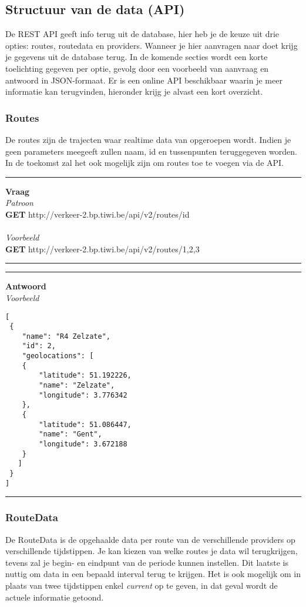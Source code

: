 \documentclass[ps,a4paper,oneside]{report}
\begin{document}
\subsection{Structuur van de data (API)}
De REST API geeft info terug uit de database, hier heb je de keuze uit drie opties: routes, routedata en providers. Wanneer je hier aanvragen naar doet krijg je gegevens uit de database terug. In de komende secties wordt een korte toelichting gegeven per optie, gevolg door een voorbeeld van aanvraag en antwoord in JSON-formaat. Er is een online API beschikbaar waarin je meer informatie kan terugvinden, hieronder krijg je alvast een kort overzicht.

\subsubsection{Routes}
De routes zijn de trajecten waar realtime data van opgeroepen wordt. Indien je geen parameters meegeeft zullen naam, id en tussenpunten teruggegeven worden. In de toekomst zal het ook mogelijk zijn om routes toe te voegen via de API.
\clearpage
\noindent\rule[0.5ex]{\linewidth}{1pt}
\textbf{Vraag}\\
\textit{Patroon}\\
\textbf{GET} http://verkeer-2.bp.tiwi.be/api/v2/routes/id\\\\
\textit{Voorbeeld}\\
\textbf{GET} http://verkeer-2.bp.tiwi.be/api/v2/routes/1,2,3\\
\noindent\rule[0.5ex]{\linewidth}{1pt}

\noindent\rule[0.5ex]{\linewidth}{1pt}
\textbf{Antwoord}\\
\textit{Voorbeeld}
\begin{verbatim}[
 {
    "name": "R4 Zelzate",
    "id": 2,
    "geolocations": [
    {
        "latitude": 51.192226,
        "name": "Zelzate",
        "longitude": 3.776342
    },
    {
        "latitude": 51.086447,
        "name": "Gent",
        "longitude": 3.672188
    }
   ]
 }
]\end{verbatim}
\noindent\rule[0.5ex]{\linewidth}{1pt}
\subsubsection{RouteData}
De RouteData is de opgehaalde data per route van de verschillende providers op verschillende tijdstippen. Je kan kiezen van welke routes je data wil terugkrijgen, tevens zal je begin- en eindpunt van de periode kunnen instellen. Dit laatste is nuttig om data in een bepaald interval terug te krijgen. Het is ook mogelijk om in plaats van twee tijdstippen enkel \textit{current} op te geven, in dat geval wordt de actuele informatie getoond.\\\\ 
\end{document}
